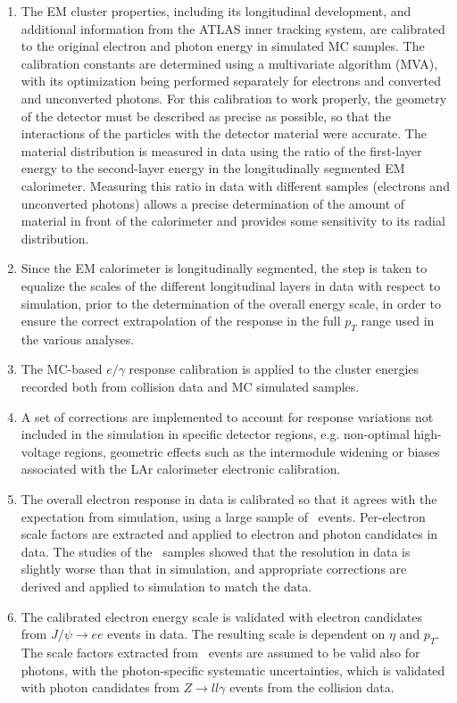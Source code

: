 \begin{enumerate}
\item The EM cluster properties, including its longitudinal development, and additional information from the ATLAS inner tracking system, are calibrated to the original electron and photon energy in simulated MC samples. The calibration constants are determined using a multivariate algorithm (MVA), with its optimization being performed separately for electrons and converted and unconverted photons. For this calibration to work properly, the geometry of the detector must be described as precise as possible, so that the interactions of the particles with the detector material were accurate. The material distribution is measured in data using the ratio of the first-layer energy to the second-layer energy in the longitudinally segmented EM calorimeter. Measuring this ratio in data with different samples (electrons and unconverted
photons) allows a precise determination of the amount of material in front of the calorimeter and provides some sensitivity to its radial distribution.
\item Since the EM calorimeter is longitudinally segmented, the step is taken to equalize the scales of the different longitudinal layers in data with respect to simulation, prior to the determination of the overall energy scale, in order to ensure the correct extrapolation of the response in the full $p_{T}$ range used in the various analyses.
\item The MC-based $e/\gamma$ response calibration is applied to the cluster energies recorded both from collision data and MC simulated samples.
\item A set of corrections are implemented to account for response variations not included in the simulation in specific detector regions, e.g. non-optimal high-voltage regions, geometric effects such as the intermodule widening or biases associated with the LAr calorimeter electronic calibration.
\item The overall electron response in data is calibrated so that it agrees with the expectation from simulation, using a large sample of \Zee\ events. Per-electron scale factors are extracted and applied to electron and photon candidates in data. The studies of the \Zee\ samples showed that the resolution in data is slightly worse than
that in simulation, and appropriate corrections are derived and applied to simulation to match the data.
\item The calibrated electron energy scale is validated with electron candidates from $J/\psi \to ee$ events in data. The resulting scale is dependent on $\eta$ and $p_{T}$. The scale factors extracted from \Zee\ events are assumed to be valid also for photons, with the photon-specific systematic uncertainties, which is validated with photon candidates from $Z \to ll\gamma$ events from the collision data.
\end{enumerate}

